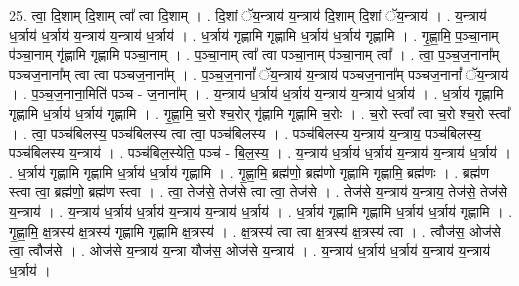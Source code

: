 \documentclass[17pt]{extarticle}
\begin{document}
25. त्वा॒ दि॒शाम् दि॒शाम् त्वा᳚ त्वा दि॒शाम् । . दि॒शां ॅय॒न्त्राय॑ य॒न्त्राय॑ दि॒शाम् दि॒शां ॅय॒न्त्राय॑ । . य॒न्त्राय॑ ध॒र्त्राय॑ ध॒र्त्राय॑ य॒न्त्राय॑ य॒न्त्राय॑ ध॒र्त्राय॑ । . ध॒र्त्राय॑ गृह्णामि गृह्णामि ध॒र्त्राय॑ ध॒र्त्राय॑ गृह्णामि । . गृ॒ह्णा॒मि॒ प॒ञ्चा॒नाम् प॑ञ्चा॒नाम् गृ॑ह्णामि गृह्णामि पञ्चा॒नाम् । . प॒ञ्चा॒नाम् त्वा᳚ त्वा पञ्चा॒नाम् प॑ञ्चा॒नाम् त्वा᳚ । . त्वा॒ प॒ञ्च॒ज॒नाना᳚म् पञ्चज॒नाना᳚म् त्वा त्वा पञ्चज॒नाना᳚म् । . प॒ञ्च॒ज॒नानां᳚ ॅय॒न्त्राय॑ य॒न्त्राय॑ पञ्चज॒नाना᳚म् पञ्चज॒नानां᳚ ॅय॒न्त्राय॑ । . प॒ञ्च॒ज॒नाना॒मिति॑ पञ्च - ज॒नाना᳚म् । . य॒न्त्राय॑ ध॒र्त्राय॑ ध॒र्त्राय॑ य॒न्त्राय॑ य॒न्त्राय॑ ध॒र्त्राय॑ । . ध॒र्त्राय॑ गृह्णामि गृह्णामि ध॒र्त्राय॑ ध॒र्त्राय॑ गृह्णामि । . गृ॒ह्णा॒मि॒ च॒रो श्च॒रोर् गृ॑ह्णामि गृह्णामि च॒रोः । . च॒रो स्त्वा᳚ त्वा च॒रो श्च॒रो स्त्वा᳚ । . त्वा॒ पञ्च॑बिलस्य॒ पञ्च॑बिलस्य त्वा त्वा॒ पञ्च॑बिलस्य । . पञ्च॑बिलस्य य॒न्त्राय॑ य॒न्त्राय॒ पञ्च॑बिलस्य॒ पञ्च॑बिलस्य य॒न्त्राय॑ । . पञ्च॑बिल॒स्येति॒ पञ्च॑ - बि॒ल॒स्य॒ । . य॒न्त्राय॑ ध॒र्त्राय॑ ध॒र्त्राय॑ य॒न्त्राय॑ य॒न्त्राय॑ ध॒र्त्राय॑ । . ध॒र्त्राय॑ गृह्णामि गृह्णामि ध॒र्त्राय॑ ध॒र्त्राय॑ गृह्णामि । . गृ॒ह्णा॒मि॒ ब्रह्म॑णो॒ ब्रह्म॑णो गृह्णामि गृह्णामि॒ ब्रह्म॑णः । . ब्रह्म॑ण स्त्वा त्वा॒ ब्रह्म॑णो॒ ब्रह्म॑ण स्त्वा । . त्वा॒ तेज॑से॒ तेज॑से त्वा त्वा॒ तेज॑से । . तेज॑से य॒न्त्राय॑ य॒न्त्राय॒ तेज॑से॒ तेज॑से य॒न्त्राय॑ । . य॒न्त्राय॑ ध॒र्त्राय॑ ध॒र्त्राय॑ य॒न्त्राय॑ य॒न्त्राय॑ ध॒र्त्राय॑ । . ध॒र्त्राय॑ गृह्णामि गृह्णामि ध॒र्त्राय॑ ध॒र्त्राय॑ गृह्णामि । . गृ॒ह्णा॒मि॒ क्ष॒त्रस्य॑ क्ष॒त्रस्य॑ गृह्णामि गृह्णामि क्ष॒त्रस्य॑ । . क्ष॒त्रस्य॑ त्वा त्वा क्ष॒त्रस्य॑ क्ष॒त्रस्य॑ त्वा । . त्वौज॑स॒ ओज॑से त्वा॒ त्वौज॑से । . ओज॑से य॒न्त्राय॑ य॒न्त्रा यौज॑स॒ ओज॑से य॒न्त्राय॑ । . य॒न्त्राय॑ ध॒र्त्राय॑ ध॒र्त्राय॑ य॒न्त्राय॑ य॒न्त्राय॑ ध॒र्त्राय॑ । \newline
\end{document}
